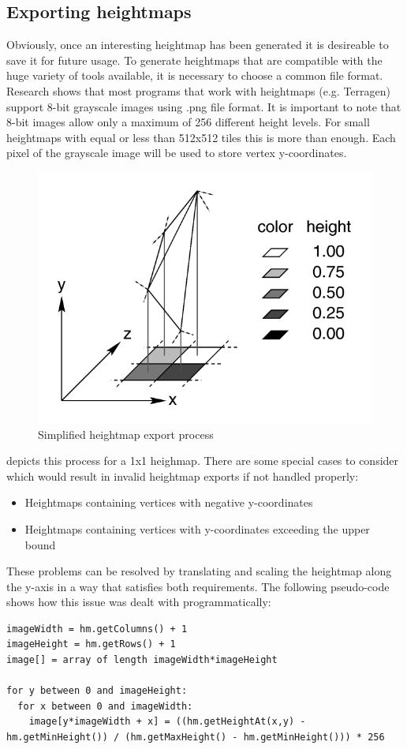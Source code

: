 \documentclass[11pt,a4paper,twoside,openright]{report}
\begin{document}
\subsection{Exporting heightmaps}
\label{subsec:exportingheightmaps}
Obviously, once an interesting heightmap has been generated it is desireable to save it for future usage. To generate heightmaps that are compatible with the huge variety of tools available, it is necessary to choose a common file format. Research shows that most programs that work with heightmaps (e.g. Terragen) support 8-bit grayscale images using .png file format. It is important to note that 8-bit images allow only a maximum of 256 different height levels. For small heightmaps with equal or less than 512x512 tiles this is more than enough. Each pixel of the grayscale image will be used to store vertex y-coordinates.
\begin{figure}[h]
\centering
\includegraphics[width=0.4\linewidth]{pixhfld.png}
\caption{
  Simplified heightmap export process \cite{POVRay:HeightField}
}
\label{fig:heightfield}
\end{figure}
 depicts this process for a 1x1 heighmap. There are some special cases to consider which would result in invalid heightmap exports if not handled properly:
\begin{itemize}
  \item Heightmaps containing vertices with negative y-coordinates
  \item Heightmaps containing vertices with y-coordinates exceeding the upper bound
\end{itemize}
These problems can be resolved by translating and scaling the heightmap along the y-axis in a way that satisfies both requirements. The following pseudo-code shows how this issue was dealt with programmatically:
\begin{lstlisting}[caption=Heightmap export pseudo-code]
imageWidth = hm.getColumns() + 1
imageHeight = hm.getRows() + 1
image[] = array of length imageWidth*imageHeight

for y between 0 and imageHeight:
  for x between 0 and imageWidth:
    image[y*imageWidth + x] = ((hm.getHeightAt(x,y) - hm.getMinHeight()) / (hm.getMaxHeight() - hm.getMinHeight())) * 256
\end{lstlisting}
\end{document}
